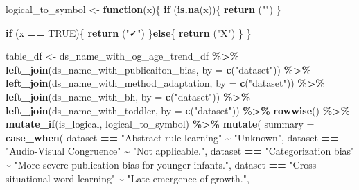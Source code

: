 \documentclass[
]{article}
\newenvironment{Shaded}{\begin{snugshade}}{\end{snugshade}}
\newcommand{\AttributeTok}[1]{\textcolor[rgb]{0.13,0.29,0.53}{#1}}
\newcommand{\ConstantTok}[1]{\textcolor[rgb]{0.56,0.35,0.01}{#1}}
\newcommand{\ControlFlowTok}[1]{\textcolor[rgb]{0.13,0.29,0.53}{\textbf{#1}}}
\newcommand{\FunctionTok}[1]{\textcolor[rgb]{0.13,0.29,0.53}{\textbf{#1}}}
\newcommand{\NormalTok}[1]{#1}
\newcommand{\OtherTok}[1]{\textcolor[rgb]{0.56,0.35,0.01}{#1}}
\newcommand{\SpecialCharTok}[1]{\textcolor[rgb]{0.81,0.36,0.00}{\textbf{#1}}}
\newcommand{\StringTok}[1]{\textcolor[rgb]{0.31,0.60,0.02}{#1}}
\begin{document}
\begin{Shaded}
\begin{Highlighting}[]
\NormalTok{logical\_to\_symbol }\OtherTok{\textless{}{-}} \ControlFlowTok{function}\NormalTok{(x)\{}
  \ControlFlowTok{if}\NormalTok{ (}\FunctionTok{is.na}\NormalTok{(x))\{}
    \FunctionTok{return}\NormalTok{ (}\StringTok{""}\NormalTok{)}
\NormalTok{  \}}
  
  \ControlFlowTok{if}\NormalTok{ (x }\SpecialCharTok{==} \ConstantTok{TRUE}\NormalTok{)\{}
    \FunctionTok{return}\NormalTok{ (}\StringTok{"✓"}\NormalTok{)}
\NormalTok{  \}}\ControlFlowTok{else}\NormalTok{\{}
    \FunctionTok{return}\NormalTok{ (}\StringTok{"X"}\NormalTok{)}
\NormalTok{  \}}
\NormalTok{\}}


\NormalTok{table\_df }\OtherTok{\textless{}{-}}\NormalTok{ ds\_name\_with\_og\_age\_trend\_df }\SpecialCharTok{\%\textgreater{}\%} 
  \FunctionTok{left\_join}\NormalTok{(ds\_name\_with\_publicaiton\_bias, }\AttributeTok{by =} \FunctionTok{c}\NormalTok{(}\StringTok{"dataset"}\NormalTok{)) }\SpecialCharTok{\%\textgreater{}\%} 
  \FunctionTok{left\_join}\NormalTok{(ds\_name\_with\_method\_adaptation, }\AttributeTok{by =} \FunctionTok{c}\NormalTok{(}\StringTok{"dataset"}\NormalTok{)) }\SpecialCharTok{\%\textgreater{}\%} 
  \FunctionTok{left\_join}\NormalTok{(ds\_name\_with\_bh, }\AttributeTok{by =} \FunctionTok{c}\NormalTok{(}\StringTok{"dataset"}\NormalTok{)) }\SpecialCharTok{\%\textgreater{}\%} 
  \FunctionTok{left\_join}\NormalTok{(ds\_name\_with\_toddler, }\AttributeTok{by =} \FunctionTok{c}\NormalTok{(}\StringTok{"dataset"}\NormalTok{)) }\SpecialCharTok{\%\textgreater{}\%} 
  \FunctionTok{rowwise}\NormalTok{() }\SpecialCharTok{\%\textgreater{}\%} 
  \FunctionTok{mutate\_if}\NormalTok{(is\_logical, logical\_to\_symbol) }\SpecialCharTok{\%\textgreater{}\%} 
  \FunctionTok{mutate}\NormalTok{(}
    \AttributeTok{summary =} \FunctionTok{case\_when}\NormalTok{(}
\NormalTok{      dataset }\SpecialCharTok{==} \StringTok{"Abstract rule learning"} \SpecialCharTok{\textasciitilde{}} \StringTok{"Unknown"}\NormalTok{, }
\NormalTok{      dataset }\SpecialCharTok{==} \StringTok{"Audio{-}Visual Congruence"} \SpecialCharTok{\textasciitilde{}} \StringTok{"Not applicable."}\NormalTok{, }
\NormalTok{      dataset }\SpecialCharTok{==} \StringTok{"Categorization bias"} \SpecialCharTok{\textasciitilde{}} \StringTok{"More severe publication bias for younger infants."}\NormalTok{, }
\NormalTok{      dataset }\SpecialCharTok{==} \StringTok{"Cross{-}situational word learning"} \SpecialCharTok{\textasciitilde{}} \StringTok{"Late emergence of growth."}\NormalTok{,}

\end{Highlighting}
\end{Shaded}
\end{document}
